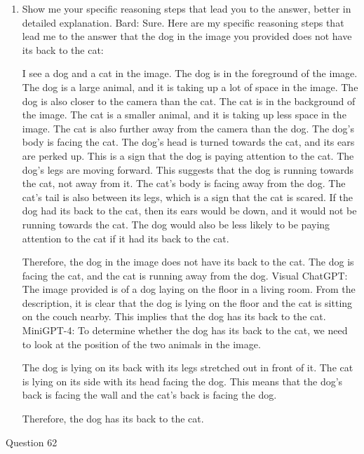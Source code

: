 \begin{enumerate}
    Therefore, the dog in the image does not have its back to the cat.
    \subitem Visual ChatGPT: Yes, the dog has its back to the cat.
    \subitem MiniGPT-4: Yes, the dog has its back to the cat in the image.
    \item Show me your specific reasoning steps that lead you to the answer, better in detailed explanation.
    \subitem Bard: Sure. Here are my specific reasoning steps that lead me to the answer that the dog in the image you provided does not have its back to the cat:

    I see a dog and a cat in the image.
    The dog is in the foreground of the image. The dog is a large animal, and it is taking up a lot of space in the image. The dog is also closer to the camera than the cat.
    The cat is in the background of the image. The cat is a smaller animal, and it is taking up less space in the image. The cat is also further away from the camera than the dog.
    The dog's body is facing the cat. The dog's head is turned towards the cat, and its ears are perked up. This is a sign that the dog is paying attention to the cat.
    The dog's legs are moving forward. This suggests that the dog is running towards the cat, not away from it.
    The cat's body is facing away from the dog. The cat's tail is also between its legs, which is a sign that the cat is scared.
    If the dog had its back to the cat, then its ears would be down, and it would not be running towards the cat. The dog would also be less likely to be paying attention to the cat if it had its back to the cat.
    
    Therefore, the dog in the image does not have its back to the cat.
    The dog is facing the cat, and the cat is running away from the dog.
    \subitem Visual ChatGPT: The image provided is of a dog laying on the floor in a living room. From the description, it is clear that the dog is lying on the floor and the cat is sitting on the couch nearby. This implies that the dog has its back to the cat.
    \subitem MiniGPT-4: To determine whether the dog has its back to the cat, we need to look at the position of the two animals in the image.

    The dog is lying on its back with its legs stretched out in front of it. The cat is lying on its side with its head facing the dog. This means that the dog’s back is facing the wall and the cat’s back is facing the dog.
    
    Therefore, the dog has its back to the cat.
\end{enumerate}
Question 62\\
